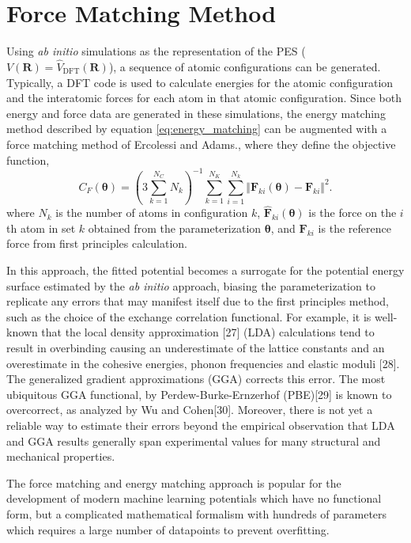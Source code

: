 \section{Force Matching Method}
Using \emph{ab initio} simulations as the representation of the PES ($V(\bm{R})=\hat{V}_{\text{DFT}}(\bm{R})$), a sequence of atomic configurations can be generated.  Typically, a DFT code is used to calculate energies for the atomic configuration and the interatomic forces for each atom in that atomic configuration. Since both energy and force data are generated in these simulations, the energy matching method described by equation \ref{eq:energy_matching} can be augmented with a force matching method of Ercolessi and Adams.\cite{ercolessi1994_fitting_forcematching}, where they define the objective function,
\begin{equation}
\label{eq:force_matching}
	C_{F}(\bm{\theta}) = \left(3\sum_{k=1}^{N_C} N_k \right)^{-1}
		\sum_{k=1}^{N_K}\sum_{i=1}^{N_k}
			\Vert \hat{\bm{F}}_{ki}(\bm{\theta}) - \bm{F}_{ki}\Vert^2.
\end{equation}
where $N_k$ is the number of atoms in configuration $k$, $\hat{\bm{F}}_{ki}(\bm{\theta})$ is the force on the $i$th atom in set $k$ obtained from the parameterization $\bm{\theta}$, and $\bm{F}_{ki}$ is the reference force from first principles calculation.

In this approach, the fitted potential becomes a surrogate for the potential energy surface estimated by the \emph{ab initio} approach, biasing the parameterization to replicate any errors that may manifest itself due to the first principles method, such as the choice of the exchange correlation functional.  For example, it is well-known that the local density approximation [27] (LDA) calculations tend to result in overbinding causing an underestimate of the lattice constants and an overestimate in the cohesive energies, phonon frequencies and elastic moduli [28].  The generalized gradient approximations (GGA) corrects this error.  The most ubiquitous GGA functional, by Perdew-Burke-Ernzerhof (PBE)[29] is known to overcorrect, as analyzed by Wu and Cohen[30].  Moreover, there is not yet a reliable way to estimate their errors beyond the empirical observation that LDA and GGA results generally span experimental values for many structural and mechanical properties.

The force matching and energy matching approach is popular for the development of modern machine learning potentials which have no functional form, but a complicated mathematical formalism with hundreds of parameters\cite{behler2016_ml_pot} which requires a large number of datapoints to prevent overfitting\cite{wood2018_snap}.

